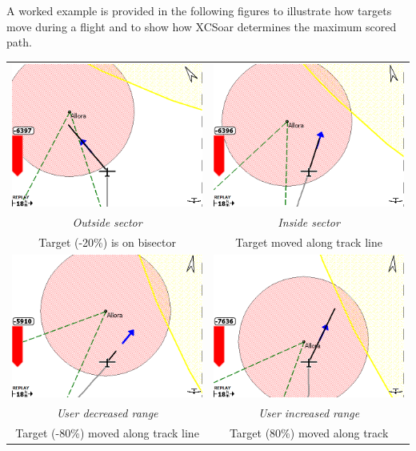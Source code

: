 \documentclass[a4paper,12pt]{refrep}
\begin{document}
A worked example is provided in the following figures to illustrate
how targets move during a flight and to show how XCSoar determines the
maximum scored path.

\begin{maxipage}
\begin{center}
\begin{longtable}{|c|c|}
\toprule
\includegraphics[angle=0,width=0.45\linewidth,keepaspectratio='true']{figures/faat01.png} & 
\includegraphics[angle=0,width=0.45\linewidth,keepaspectratio='true']{figures/faat02.png} \\
{\em Outside sector} & {\em Inside sector} \\
Target (-20\%) is on bisector & Target moved along track line \\
 \midrule
\includegraphics[angle=0,width=0.45\linewidth,keepaspectratio='true']{figures/faat03.png} & 
\includegraphics[angle=0,width=0.45\linewidth,keepaspectratio='true']{figures/faat04.png} \\
{\em User decreased range} & {\em User increased range} \\
Target (-80\%) moved along track line & Target (80\%) moved along track \\


\end{longtable}
\end{center}
\end{maxipage}
\end{document}
